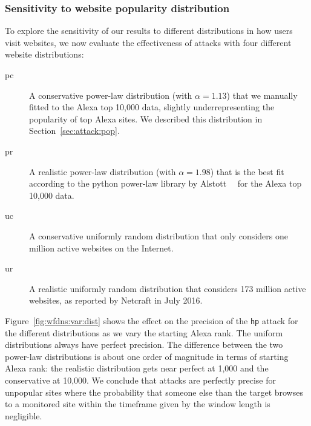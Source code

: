 
\subsubsection{Sensitivity to website popularity distribution}

To explore the sensitivity of our results to different distributions in
how users visit websites, we now evaluate the effectiveness of \name
attacks with four different website distributions:
\begin{description}
	\item[pc] A conservative power-law distribution
	(with $\alpha=1.13$)
	that we manually fitted to the Alexa top 10,000 data,
	slightly underrepresenting the popularity of top Alexa sites.
	We described this distribution in Section~\ref{sec:attack:pop}.
	\item[pr] A realistic power-law distribution
	(with $\alpha=1.98$)
	that is the best fit according to
	the python power-law library by Alstott~\ea~\cite{power-law} for the Alexa
	top 10,000 data.
	\item[uc] A conservative uniformly random distribution that
	only considers one million active websites on the Internet.
	\item[ur] A realistic uniformly random distribution that
          considers 173 million active websites, as reported by Netcraft
          in July 2016. 
\end{description}
Figure~\ref{fig:wfdns:var:dist} shows the effect on the precision of the
\texttt{hp} attack for the different distributions as we vary the starting
Alexa rank. The uniform distributions always have perfect precision.
The difference between the two power-law distributions is about one order of
magnitude in terms of starting Alexa rank: the realistic distribution gets
near perfect at 1,000 and the conservative at 10,000.
We conclude that \name attacks are perfectly precise for unpopular sites
where the probability that someone else than the target browses to a monitored
site within the timeframe given by the window length is negligible.

